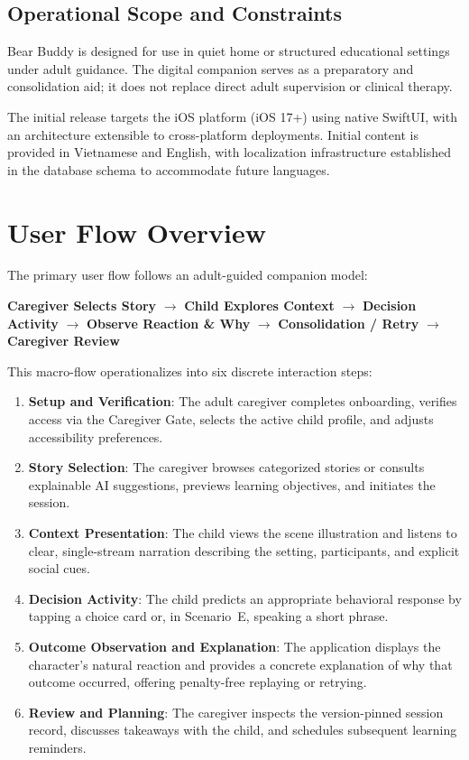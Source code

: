\subsection{Operational Scope and Constraints}

Bear Buddy is designed for use in quiet home or structured educational settings under adult guidance. The digital companion serves as a preparatory and consolidation aid; it does not replace direct adult supervision or clinical therapy.

The initial release targets the iOS platform (iOS 17+) using native SwiftUI, with an architecture extensible to cross-platform deployments. Initial content is provided in Vietnamese and English, with localization infrastructure established in the database schema to accommodate future languages.

\section{User Flow Overview}

The primary user flow follows an adult-guided companion model:
\begin{center}
\textbf{Caregiver Selects Story} $\longrightarrow$ \textbf{Child Explores Context} $\longrightarrow$ \textbf{Decision Activity} $\longrightarrow$ \textbf{Observe Reaction \& Why} $\longrightarrow$ \textbf{Consolidation / Retry} $\longrightarrow$ \textbf{Caregiver Review}
\end{center}

This macro-flow operationalizes into six discrete interaction steps:
\begin{enumerate}
    \item \textbf{Setup and Verification}: The adult caregiver completes onboarding, verifies access via the Caregiver Gate, selects the active child profile, and adjusts accessibility preferences.
    \item \textbf{Story Selection}: The caregiver browses categorized stories or consults explainable AI suggestions, previews learning objectives, and initiates the session.
    \item \textbf{Context Presentation}: The child views the scene illustration and listens to clear, single-stream narration describing the setting, participants, and explicit social cues.
    \item \textbf{Decision Activity}: The child predicts an appropriate behavioral response by tapping a choice card or, in Scenario~E, speaking a short phrase.
    \item \textbf{Outcome Observation and Explanation}: The application displays the character's natural reaction and provides a concrete explanation of why that outcome occurred, offering penalty-free replaying or retrying.
    \item \textbf{Review and Planning}: The caregiver inspects the version-pinned session record, discusses takeaways with the child, and schedules subsequent learning reminders.
\end{enumerate}

